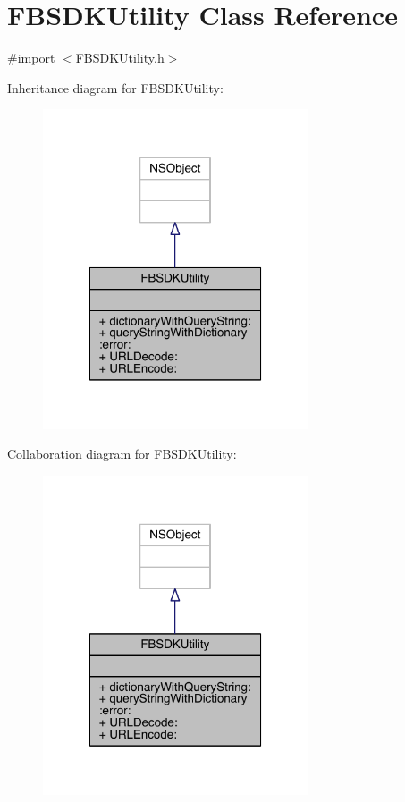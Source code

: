 \hypertarget{interface_f_b_s_d_k_utility}{\section{F\-B\-S\-D\-K\-Utility Class Reference}
\label{interface_f_b_s_d_k_utility}
}


{\ttfamily \#import $<$F\-B\-S\-D\-K\-Utility.\-h$>$}



Inheritance diagram for F\-B\-S\-D\-K\-Utility\-:
\nopagebreak
\begin{figure}[H]
\begin{center}
\leavevmode
\includegraphics[width=222pt]{interface_f_b_s_d_k_utility__inherit__graph}
\end{center}
\end{figure}


Collaboration diagram for F\-B\-S\-D\-K\-Utility\-:
\nopagebreak
\begin{figure}[H]
\begin{center}
\leavevmode
\includegraphics[width=222pt]{interface_f_b_s_d_k_utility__coll__graph}
\end{center}
\end{figure}
